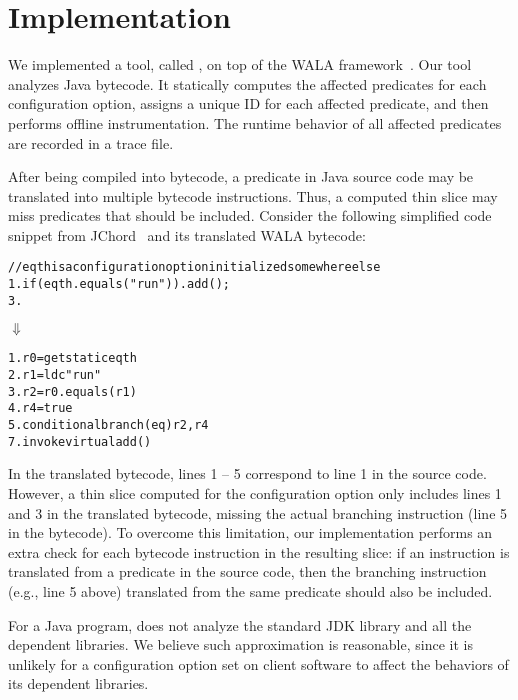 \section{Implementation}
\label{sec:implementation}

We implemented a tool, called \ourtool, on top of the WALA
framework~\cite{wala}. Our tool analyzes Java bytecode.
It statically computes the affected predicates
for each configuration option, assigns a unique
ID for each affected predicate, and then performs offline instrumentation.
The runtime behavior of all affected predicates are recorded
in a trace file. 


After being compiled into bytecode,
a predicate in Java source code may be translated into multiple bytecode
instructions. Thus, a computed thin slice may
miss predicates that should be included.
Consider the following simplified code snippet from JChord~\cite{jchordtutorial}
and its translated WALA bytecode:


\begin{CodeOut}
\begin{alltt}
   // eqth is a configuration option initialized somewhere else
1. if (eqth.equals("run")) .   add();
3. \ttrcb
\end{alltt}
\end{CodeOut}
\vspace{-2mm}
\hspace{20mm}$\Downarrow$ 
\begin{CodeOut}
\begin{alltt}
1. r0 = getstatic eqth
2. r1 = ldc "run"
3. r2 = r0.equals(r1)
4. r4 = true
5. conditional branch(eq) r2, r4
7. invokevirtual add() 
\end{alltt}
\end{CodeOut}

In the translated bytecode, lines 1 -- 5 correspond to line 1 in the
source code. However, a thin slice computed
for the configuration option  only includes lines 1 and 3
in the translated bytecode, missing the actual branching
instruction (line 5 in the bytecode).
To overcome this limitation, our implementation performs an extra check
for each bytecode instruction in the resulting slice:
if an instruction 
is translated from a predicate in the source code, then the
branching instruction (e.g., line 5 above) translated
from the same predicate should also be included.


For a Java program, \ourtool does not analyze the standard JDK
library and all the dependent libraries. We believe such approximation
is reasonable, since it is
unlikely for a configuration option set on client software
to affect the behaviors of its dependent libraries.


